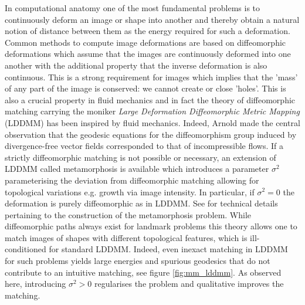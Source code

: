 \documentclass[runningheads]{llncs}
\begin{document}
In computational anatomy
\cite{grenander1994representations,grenander1998computational} one of the most
fundamental problems is to continuously deform an image or shape into another
and thereby obtain a natural notion of distance between them as the energy
required for such a deformation. Common methods to compute image deformations
are based on diffeomorphic deformations which assume that the images are
continuously deformed into one another with the additional property that the
inverse deformation is also continuous.  This is a strong requirement for images
which implies that the 'mass' of any part of the image is conserved: we cannot
create or close 'holes'.  This is also a crucial property in fluid mechanics and
in fact the theory of diffeomorphic matching carrying the moniker \emph{Large
Deformation Diffeomorphic Metric Mapping} (LDDMM)
\cite{trouve1998diffeomorphisms,beg2005computing} has been inspired by fluid
mechanics. Indeed, Arnold \cite{arnold1966geometrie} made the central
observation that the geodesic equations for the diffeomorphism group induced by
divergence-free vector fields corresponded to that of incompressible flows. If a
strictly diffeomorphic matching is not possible or necessary, an extension of
LDDMM called metamorphosis \cite{trouve2005metamorphoses,holm2009euler} is
available which introduces a parameter $\sigma^2$ parameterising the deviation
from diffeomorphic matching allowing for topological variations e.g. growth via
image intensity. In particular, if $\sigma^2=0$ the deformation is purely
diffeomorphic as in LDDMM.  See
\cite{trouve1995infinite,trouve2005local,miller2001group} for technical details
pertaining to the construction of the metamorphosis problem. While diffeomorphic
paths always exist for landmark problems \cite{guo2006diffeomorphic} this
theory allows one to match images of shapes with different topological features,
which is ill-conditioned for standard LDDMM. Indeed, even inexact matching in
LDDMM for such problems yields large energies and spurious geodesics that do not
contribute to an intuitive matching, see figure \ref{fig:mm_lddmm}. As observed
here, introducing $\sigma^2>0$ regularises the problem and qualitative improves
the matching.\\
\end{document}
